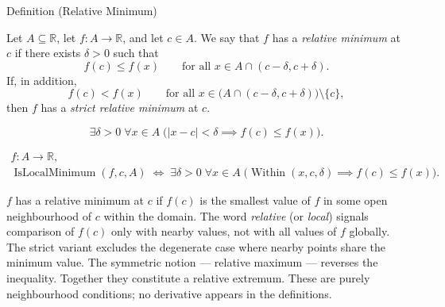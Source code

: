 
\begin{definitionbox}{Definition (Relative Minimum)}
\begin{definition}
\label{def:relative-minimum}
Let $A \subseteq \mathbb{R}$, let $f : A \to \mathbb{R}$, and let $c \in A$. We say that $f$ has a \emph{relative minimum} at $c$ if there exists $\delta > 0$ such that
\[
f(c) \leq f(x) \qquad \text{for all } x \in A \cap (c-\delta,c+\delta).
\]
If, in addition,
\[
f(c) < f(x) \qquad \text{for all } x \in \bigl(A \cap (c-\delta,c+\delta)\bigr)\setminus\{c\},
\]
then $f$ has a \emph{strict relative minimum} at $c$.
\end{definition}
\end{definitionbox}

\begin{remark*}
\[
\exists \delta > 0\;\forall x \in A\;
\bigl(|x - c| < \delta \implies f(c) \leq f(x)\bigr).
\]
\end{remark*}

\begin{remark*}
\[
\begin{aligned}
  f\colon A\to\mathbb{R},\\
\operatorname{IsLocalMinimum}(f,c,A)
\;\Longleftrightarrow\;
\exists \delta > 0\;\forall x \in A\;
\bigl(\operatorname{Within}(x, c, \delta) \implies f(c) \leq f(x)\bigr).
\end{aligned}
\]
\end{remark*}

\begin{remark*}[Interpretation]
$f$ has a relative minimum at $c$ if $f(c)$ is the smallest value of $f$ in some open neighbourhood of $c$ within the domain. The word \emph{relative} (or \emph{local}) signals comparison of $f(c)$ only with nearby values, not with all values of $f$ globally. The strict variant excludes the degenerate case where nearby points share the minimum value. The symmetric notion --- relative maximum --- reverses the inequality. Together they constitute a relative extremum. These are purely neighbourhood conditions; no derivative appears in the definitions.
\end{remark*}

